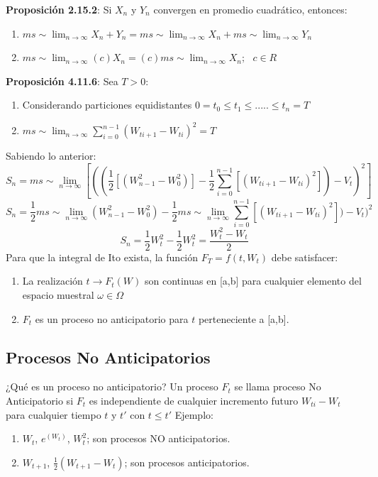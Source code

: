 \documentclass[11pt,fleqn]{book} %
\numberwithin{equation}{section} %
\numberwithin{figure}{section} %
\numberwithin{table}{section} %
\begin{document}
\textbf{Proposición 2.15.2}: Si $X_{n}$ y $Y_{n}$ convergen en promedio cuadrático, entonces:
\begin{enumerate}
\item $ ms\sim \lim_{n \to \infty} X_{n} + Y_{n} = ms\sim \lim_{n \to \infty} X_{n} + ms\sim \lim_{n \to \infty} Y_{n}$
\item $ ms\sim \lim_{n \to \infty} (c)X_{n} = (c) ms\sim \lim_{n \to \infty} X_{n}; \:\:\: c \in R$
\end{enumerate}
\textbf{Proposición 4.11.6}: Sea $T>0$:
\begin{enumerate}
\item Considerando particiones equidistantes $0=t_{0}\leq t_{1}\leq ..... \leq t_{n} = T$
\item $ ms\sim \lim_{n \to \infty} \sum_{i=0}^{n-1}(W_{ti+1}-W_{ti})^2= T$
\end{enumerate}
Sabiendo lo anterior:
$$S_{n} = ms\sim \lim_{n \to \infty} [((\frac{1}{2}[(W_{n-1}^2 - W_{0}^2)] - \frac{1}{2}\sum_{i=0}^{n-1}[(W_{ti + 1} - W_{ti})^2 ]) - V_{t})^2]$$
$$ S_{n} = \frac{1}{2} ms\sim \lim_{n \to \infty} (W_{n-1}^2 - W_{0}^2) - \frac{1}{2} ms\sim \lim_{n \to \infty} \sum_{i=0}^{n-1}[(W_{ti + 1} - W_{ti})^2 ]) - V_{t})^2 $$
$$S_{n} = \frac{1}{2} W_{t}^2 - \frac{1}{2} W_{t}^2 = \frac{W_{t}^2 - W_{t}}{2}$$
Para que la integral de Ito exista, la función $F_{T} = f(t,W_{t})$ debe satisfacer:
\begin{enumerate}
\item La realización $t \to F_{t}(W) $ son continuas en [a,b] para cualquier elemento del espacio muestral $\omega \in \Omega$
\item $F_{t}$ es un proceso no anticipatorio para $t$ perteneciente a [a,b].
\end{enumerate}
\subsection{Procesos No Anticipatorios}
¿Qué es un proceso no anticipatorio?
Un proceso $F_{t}$ se llama proceso No Anticipatorio si $F_{t}$ es independiente de cualquier incremento futuro $W_{ti}-W_{t}$ para cualquier tiempo $t$ y $t'$ con $t \leq t'$
Ejemplo:
\begin{enumerate}
\item $W_{t}$, $e^(W_{t})$, $W_{t}^2$; son procesos NO anticipatorios.
\item $W_{t+1}$, $\frac{1}{2}(W_{t+1} - W_{t})$; son procesos anticipatorios.
\end{enumerate}
\end{document}
